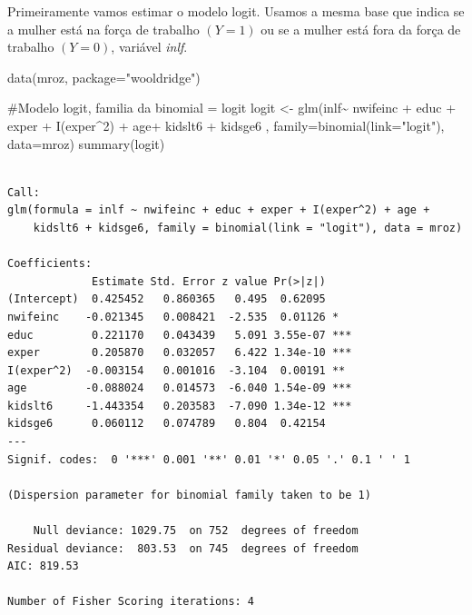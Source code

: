 \documentclass[
  letterpaper,
  DIV=11,
  numbers=noendperiod]{scrreprt}
\newenvironment{Shaded}{\begin{snugshade}}{\end{snugshade}}
\newcommand{\AttributeTok}[1]{\textcolor[rgb]{0.40,0.45,0.13}{#1}}
\newcommand{\CommentTok}[1]{\textcolor[rgb]{0.37,0.37,0.37}{#1}}
\newcommand{\DecValTok}[1]{\textcolor[rgb]{0.68,0.00,0.00}{#1}}
\newcommand{\FunctionTok}[1]{\textcolor[rgb]{0.28,0.35,0.67}{#1}}
\newcommand{\NormalTok}[1]{\textcolor[rgb]{0.00,0.23,0.31}{#1}}
\newcommand{\OtherTok}[1]{\textcolor[rgb]{0.00,0.23,0.31}{#1}}
\newcommand{\SpecialCharTok}[1]{\textcolor[rgb]{0.37,0.37,0.37}{#1}}
\newcommand{\StringTok}[1]{\textcolor[rgb]{0.13,0.47,0.30}{#1}}
\begin{document}
Primeiramente vamos estimar o modelo logit. Usamos a mesma base que
indica se a mulher está na força de trabalho \((Y=1)\) ou se a mulher
está fora da força de trabalho \((Y=0)\), variável \emph{inlf}.

\begin{Shaded}
\begin{Highlighting}[]
\FunctionTok{data}\NormalTok{(mroz, }\AttributeTok{package=}\StringTok{"wooldridge"}\NormalTok{)}

\CommentTok{\#Modelo logit, familia da binomial = logit}
\NormalTok{logit }\OtherTok{\textless{}{-}} \FunctionTok{glm}\NormalTok{(inlf}\SpecialCharTok{\textasciitilde{}}\NormalTok{ nwifeinc }\SpecialCharTok{+}\NormalTok{ educ }\SpecialCharTok{+}\NormalTok{ exper }\SpecialCharTok{+} \FunctionTok{I}\NormalTok{(exper}\SpecialCharTok{\^{}}\DecValTok{2}\NormalTok{) }\SpecialCharTok{+} 
\NormalTok{                  age}\SpecialCharTok{+}\NormalTok{ kidslt6 }\SpecialCharTok{+}\NormalTok{ kidsge6 , }\AttributeTok{family=}\FunctionTok{binomial}\NormalTok{(}\AttributeTok{link=}\StringTok{"logit"}\NormalTok{), }\AttributeTok{data=}\NormalTok{mroz)}
\FunctionTok{summary}\NormalTok{(logit)}
\end{Highlighting}
\end{Shaded}

\begin{verbatim}

Call:
glm(formula = inlf ~ nwifeinc + educ + exper + I(exper^2) + age + 
    kidslt6 + kidsge6, family = binomial(link = "logit"), data = mroz)

Coefficients:
             Estimate Std. Error z value Pr(>|z|)    
(Intercept)  0.425452   0.860365   0.495  0.62095    
nwifeinc    -0.021345   0.008421  -2.535  0.01126 *  
educ         0.221170   0.043439   5.091 3.55e-07 ***
exper        0.205870   0.032057   6.422 1.34e-10 ***
I(exper^2)  -0.003154   0.001016  -3.104  0.00191 ** 
age         -0.088024   0.014573  -6.040 1.54e-09 ***
kidslt6     -1.443354   0.203583  -7.090 1.34e-12 ***
kidsge6      0.060112   0.074789   0.804  0.42154    
---
Signif. codes:  0 '***' 0.001 '**' 0.01 '*' 0.05 '.' 0.1 ' ' 1

(Dispersion parameter for binomial family taken to be 1)

    Null deviance: 1029.75  on 752  degrees of freedom
Residual deviance:  803.53  on 745  degrees of freedom
AIC: 819.53

Number of Fisher Scoring iterations: 4
\end{verbatim}
\end{document}
